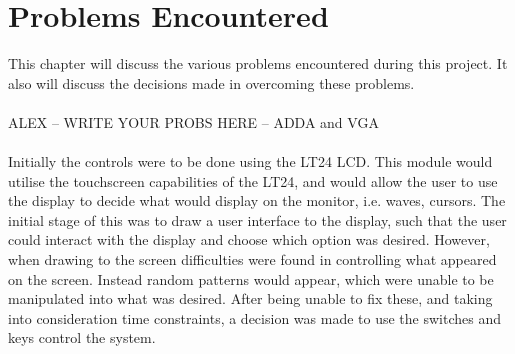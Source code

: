 \documentclass[a4paper,12pt]{article}
\begin{document}
\section{Problems Encountered}
\begin{flushleft}
This chapter will discuss the various problems encountered during this project. It also will discuss the decisions made in overcoming these problems. 
\\ \- \\
ALEX – WRITE YOUR PROBS HERE – ADDA and VGA
\\ \- \\
Initially the controls were to be done using the LT24 LCD. This module would utilise the touchscreen capabilities of the LT24, and would allow the user to use the display to decide what would display on the monitor, i.e. waves, cursors. The initial stage of this was to draw a user interface to the display, such that the user could interact with the display and choose which option was desired. However, when drawing to the screen difficulties were found in controlling what appeared on the screen. Instead random patterns would appear, which were unable to be manipulated into what was desired. After being unable to fix these, and taking into consideration time constraints, a decision was made to use the switches and keys control the system. 
\end{flushleft}
\newpage
\end{document}

